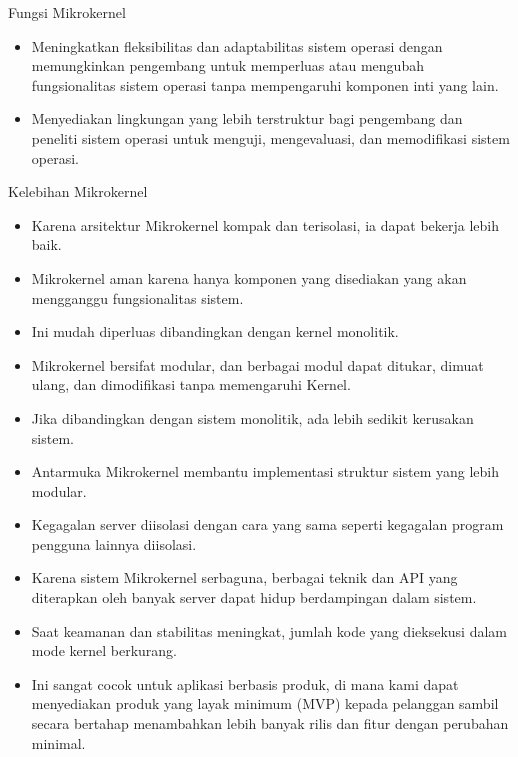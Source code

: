 \documentclass{beamer}
\begin{document}
\begin{frame}{Fungsi Mikrokernel}
\begin{itemize}
		\item Meningkatkan fleksibilitas dan adaptabilitas sistem operasi dengan memungkinkan pengembang untuk memperluas atau mengubah fungsionalitas sistem operasi tanpa mempengaruhi komponen inti yang lain.
		
		\item Menyediakan lingkungan yang lebih terstruktur bagi pengembang dan peneliti sistem operasi untuk menguji, mengevaluasi, dan memodifikasi sistem operasi.
	\end{itemize}
\end{frame}
	
	\begin{frame}{Kelebihan Mikrokernel}
	\begin{itemize}
	
		\item Karena arsitektur Mikrokernel kompak dan terisolasi, ia dapat bekerja lebih baik.
		
		\item Mikrokernel aman karena hanya komponen yang disediakan yang akan mengganggu fungsionalitas sistem. 
		
		\item Ini mudah diperluas dibandingkan dengan kernel monolitik. 
		
		\item Mikrokernel bersifat modular, dan berbagai modul dapat ditukar, dimuat ulang, dan dimodifikasi tanpa memengaruhi Kernel.
		
		\item Jika dibandingkan dengan sistem monolitik, ada lebih sedikit kerusakan sistem.
		
		\item Antarmuka Mikrokernel membantu implementasi struktur sistem yang lebih modular.
		
		\item Kegagalan server diisolasi dengan cara yang sama seperti kegagalan program pengguna lainnya diisolasi.
		
		\item Karena sistem Mikrokernel serbaguna, berbagai teknik dan API yang diterapkan oleh banyak server dapat hidup berdampingan dalam sistem.
		
		\item Saat keamanan dan stabilitas meningkat, jumlah kode yang dieksekusi dalam mode kernel berkurang.
		
		\item Ini sangat cocok untuk aplikasi berbasis produk, di mana kami dapat menyediakan produk yang layak minimum (MVP) kepada pelanggan sambil secara bertahap menambahkan lebih banyak rilis dan fitur dengan perubahan minimal.
	\end{itemize}
\end{frame}
	
\end{document}
